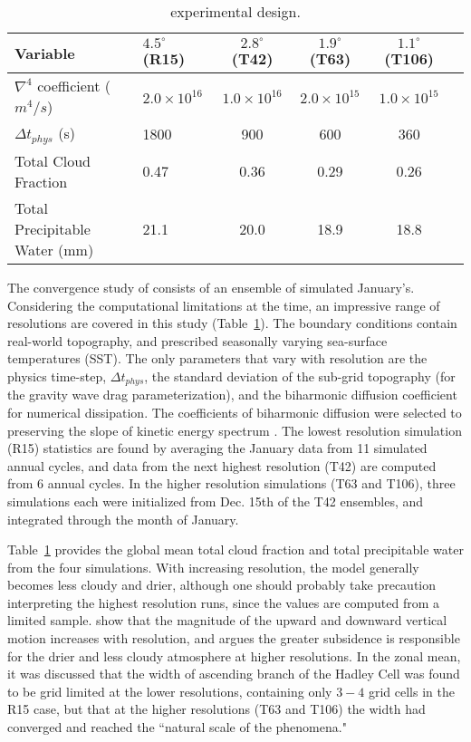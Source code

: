  \begin{table}
 \caption{\cite{KW1991JGR} experimental design.}
 \centering
 \begin{tabular}{llcccc}
 \hline
 Variable & $4.5^{\circ}$ (R15) & $2.8^{\circ}$ (T42) & $1.9^{\circ}$ (T63)  & $1.1^{\circ}$ (T106) \\
 \hline
   $\nabla^{4}$ coefficient ($m^4/s$) & $2.0 \times 10^{16}$ & $1.0 \times 10^{16}$ & $2.0 \times 10^{15}$ & $1.0 \times 10^{15}$ \\
   $\Delta t_{phys}$ (s) & 1800 & 900 & 600 & 360 \\
   Total Cloud Fraction & 0.47 & 0.36 & 0.29 & 0.26 \\
   Total Precipitable Water (mm) & 21.1 & 20.0 & 18.9 & 18.8 \\
 \hline
 \end{tabular}
 \label{tbl:table1-1}
 \end{table}

The convergence study of \cite{KW1991JGR} consists of an ensemble of simulated January's. Considering the computational limitations at the time, an impressive range of resolutions are covered in this study (Table~\ref{tbl:table1-1}). The boundary conditions contain real-world topography, and prescribed seasonally varying sea-surface temperatures (SST). The only parameters that vary with resolution are the physics time-step, $\Delta t_{phys}$, the standard deviation of the sub-grid topography (for the gravity wave drag parameterization), and the biharmonic diffusion coefficient for numerical dissipation. The coefficients of biharmonic diffusion were selected to preserving the slope of kinetic energy spectrum \citep[see][]{B1991JCLIM}. The lowest resolution simulation (R15) statistics are found by averaging the January data from 11 simulated annual cycles, and data from the next highest resolution (T42) are computed from 6 annual cycles. In the higher resolution simulations (T63 and T106), three simulations each were initialized from Dec. 15th of the T42 ensembles, and integrated through the month of January.

Table~\ref{tbl:table1-1} provides the global mean total cloud fraction and total precipitable water from the four simulations. With increasing resolution, the model generally becomes less cloudy and drier, although one should probably take precaution interpreting the highest resolution runs, since the values are computed from a limited sample. \cite{KW1991JGR} show that the magnitude of the upward and downward vertical motion increases with resolution, and argues the greater subsidence is responsible for the drier and less cloudy atmosphere at higher resolutions. In the zonal mean, it was discussed that the width of ascending branch of the Hadley Cell was found to be grid limited at the lower resolutions, containing only $3-4$ grid cells in the R15 case, but that at the higher resolutions (T63 and T106) the width had converged and reached the ``natural scale of the phenomena."

